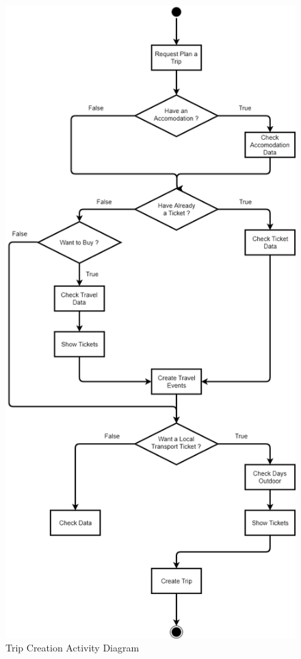 \begin{figure}[H]
	\centering
	\includegraphics[scale=0.35]{Images/Activity/Trip_Creation}
	\caption{Trip Creation Activity Diagram}
\end{figure}